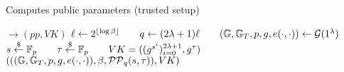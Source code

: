 \begin{algorithm}[H]
    \footnotesize
    \begin{algorithmic}[1]
    \caption{\small Computes public parameters (trusted setup)}
    \label{a:aas:setup}
     $\rightarrow (pp, VK)$ 
        \State
            $\ell \gets 2^{\lfloor\log{\beta}\rfloor} \qquad
             q \gets (2\lambda + 1)\ell \qquad
             ( \mathbb{G},\mathbb{G}_T,p,g,e(\cdot,\cdot) ) \leftarrow \mathcal{G}(1^\lambda)$
        \State
            $s\stackrel{\$}{\gets} \mathbb{F}_p \qquad
             \tau\stackrel{\$}{\gets} \mathbb{F}_p \qquad
             VK=((g^{s^i})_{i=0}^{2\lambda + 1}, g^\tau)$
        \State \Return $((( \mathbb{G},\mathbb{G}_T,p,g,e(\cdot,\cdot) ), \beta, \mathcal{PP}_q(s,\tau)), VK )$
    \EndFunction
    \end{algorithmic}
\end{algorithm}

